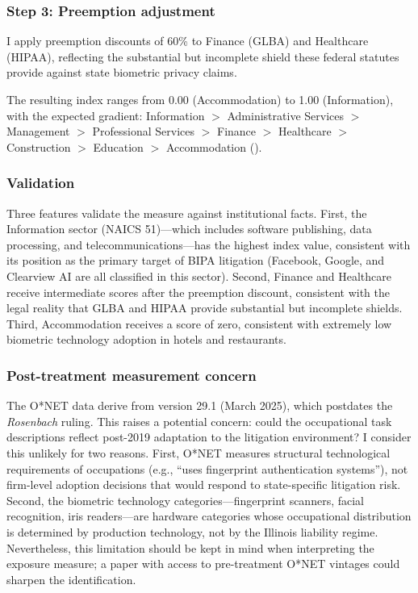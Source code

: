 \documentclass[12pt]{article}
\begin{document}
\subsubsection*{Step 3: Preemption adjustment} I apply preemption discounts of 60\% to Finance (GLBA) and Healthcare (HIPAA), reflecting the substantial but incomplete shield these federal statutes provide against state biometric privacy claims.

The resulting index ranges from 0.00 (Accommodation) to 1.00 (Information), with the expected gradient: Information $>$ Administrative Services $>$ Management $>$ Professional Services $>$ Finance $>$ Healthcare $>$ Construction $>$ Education $>$ Accommodation ().

\subsubsection*{Validation} Three features validate the measure against institutional facts. First, the Information sector (NAICS 51)---which includes software publishing, data processing, and telecommunications---has the highest index value, consistent with its position as the primary target of BIPA litigation (Facebook, Google, and Clearview AI are all classified in this sector). Second, Finance and Healthcare receive intermediate scores after the preemption discount, consistent with the legal reality that GLBA and HIPAA provide substantial but incomplete shields. Third, Accommodation receives a score of zero, consistent with extremely low biometric technology adoption in hotels and restaurants.

\subsubsection*{Post-treatment measurement concern} The O*NET data derive from version 29.1 (March 2025), which postdates the \textit{Rosenbach} ruling. This raises a potential concern: could the occupational task descriptions reflect post-2019 adaptation to the litigation environment? I consider this unlikely for two reasons. First, O*NET measures structural technological requirements of occupations (e.g., ``uses fingerprint authentication systems''), not firm-level adoption decisions that would respond to state-specific litigation risk. Second, the biometric technology categories---fingerprint scanners, facial recognition, iris readers---are hardware categories whose occupational distribution is determined by production technology, not by the Illinois liability regime. Nevertheless, this limitation should be kept in mind when interpreting the exposure measure; a paper with access to pre-treatment O*NET vintages could sharpen the identification.
\end{document}
